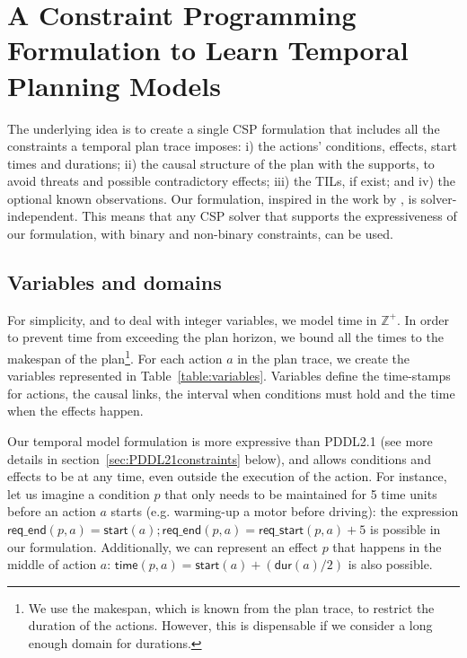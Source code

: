 \documentclass[runningheads]{llncs}
\newcommand{\dur}{\mathsf{dur}}    %
\newcommand{\start}{\mathsf{start}}%
\newcommand{\tim}{\mathsf{time}}   %
\newcommand{\reqs}{\mathsf{req\_{start}}} %
\newcommand{\reqe}{\mathsf{req\_{end}}}   %
\begin{document}
\section{A Constraint Programming Formulation to Learn Temporal Planning Models}
\label{sec:CPformulation}

The underlying idea is to create a single CSP formulation that includes all the constraints a temporal plan trace imposes: i) the actions' conditions, effects, start times and durations; ii) the causal structure of the plan with the supports, to avoid threats and possible contradictory effects; iii) the TILs, if exist; and iv) the optional known observations. Our formulation, inspired in the work by \cite{garrido2009constraint}, is solver-independent. This means that any CSP solver that supports the expressiveness of our formulation, with binary and non-binary constraints, can be used.

\subsection{Variables and domains}

For simplicity, and to deal with integer variables, we model time in $\mathbb{Z}^+$. In order to prevent time from exceeding the plan horizon, we bound all the times to the makespan of the plan\footnote{We use the makespan, which is known from the plan trace, to restrict the duration of the actions. However, this is dispensable if we consider a long enough domain for durations.}.
For each action $a$ in the plan trace, we create the variables represented in Table~\ref{table:variables}. Variables define the time-stamps for actions, the causal links, the interval when conditions must hold and the time when the effects happen.

Our temporal model formulation is more expressive than PDDL2.1 (see more details in section~\ref{sec:PDDL21constraints} below), and allows conditions and effects to be at any time, even outside the execution of the action. For instance, let us imagine a condition $p$ that only needs to be maintained for 5 time units before an action $a$ starts (e.g. warming-up a motor before driving): the expression $\reqe(p,a)=\start(a); \reqe(p,a) = \reqs(p,a)+5$ is possible in our formulation. Additionally, we can represent an effect $p$ that happens in the middle of action $a$: $\tim(p,a) = \start(a)+ (\dur(a) / 2)$ is also possible.
\end{document}
